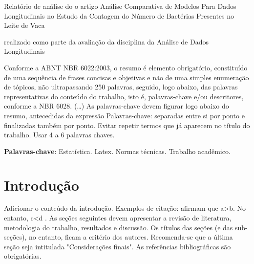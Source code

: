 \documentclass[
	article,			%
	12pt,				%
	oneside,			%
	a4paper,			%
	english,			%
	brazil,				%
	sumario=tradicional
	]{abntex2}
\date{}
\begin{document}
\frenchspacing



\maketitle
\vspace{-1cm}
\begin{resumoumacoluna}
 Relatório de análise do o artigo Análise Comparativa de Modelos Para Dados Longitudinais no Estudo da Contagem do Número de Bactérias
 Presentes no Leite de Vaca 
       
       realizado como parte da avaliação da disciplina da Análise de Dados Longitudinais
 
 
 
 Conforme a ABNT NBR 6022:2003, o resumo é elemento obrigatório, constituído de
 uma sequência de frases concisas e objetivas e não de uma simples enumeração
 de tópicos, não ultrapassando 250 palavras, seguido, logo abaixo, das palavras
 representativas do conteúdo do trabalho, isto é, palavras-chave e/ou
 descritores, conforme a NBR 6028. (\ldots) As palavras-chave devem figurar logo
 abaixo do resumo, antecedidas da expressão Palavras-chave: separadas entre si por
 ponto e finalizadas também por ponto. Evitar repetir termos que já aparecem no título do trabalho. Usar 4 a 6 palavras chaves.

 \vspace{\onelineskip}


 \noindent
 \textbf{Palavras-chave}: Estatística. Latex. Normas técnicas. Trabalho acadêmico.
\end{resumoumacoluna}


\textual

\section{Introdução}

Adicionar o conteúdo da introdução. Exemplos de citação:  afirmam que a>b. No entanto, c<d \cite{park2009median}. As seções seguintes devem apresentar a revisão de literatura, metodologia do trabalho, resultados e discussão. Os títulos das seções (e das sub-seções), no entanto, ficam a critério dos autores. Recomenda-se que a última seção seja intitulada "Considerações finais". As referências bibliográficas são obrigatórias.
\end{document}
